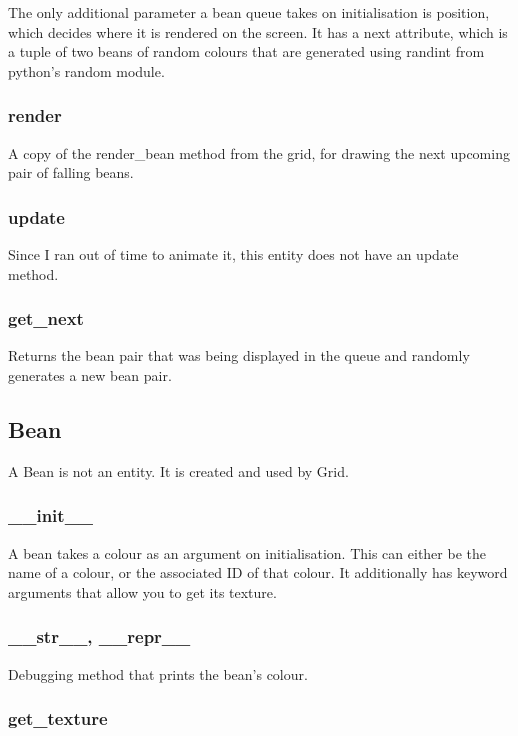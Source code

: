 \documentclass{report}
\begin{document}
The only additional parameter a bean queue takes on initialisation is position, which decides where it is rendered on the screen. It has a next attribute, which is a tuple of two beans of random colours that are generated using randint from python's random module.

\subsubsection{render}

A copy of the render\_bean method from the grid, for drawing the next upcoming pair of falling beans.

\subsubsection{update}

Since I ran out of time to animate it, this entity does not have an update method.

\subsubsection{get\_next}

Returns the bean pair that was being displayed in the queue and randomly generates a new bean pair.

\subsection{Bean}

A Bean is not an entity. It is created and used by Grid.

\subsubsection{\_\_init\_\_}

A bean takes a colour as an argument on initialisation. This can either be the name of a colour, or the associated ID of that colour. It additionally has keyword arguments that allow you to get its texture.

\subsubsection{\_\_str\_\_, \_\_repr\_\_}

Debugging method that prints the bean's colour.

\subsubsection{get\_texture}
\end{document}
